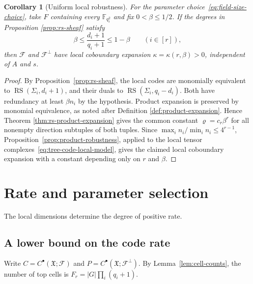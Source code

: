 \documentclass[11pt,letterpaper]{article}
\renewcommand{\le}{\leqslant}
\newtheorem{corollary}[theorem]{Corollary}
\theoremstyle{definition}
\theoremstyle{remark}
\newcommand{\F}{\mathbb F}
\newcommand{\cF}{\mathcal F}
\newcommand{\X}{\mathfrak{X}}
\newcommand{\RS}{\operatorname{RS}}
\begin{document}
\begin{corollary}[Uniform local robustness]
\label{prop:local-expansion}\label{arb:product-expansion}
For the parameter choice~\eqref{eq:field-size-choice}, take $F$ containing
every $\F_{q_i^2}$ and fix $0<\beta\le1/2$.
If the degrees in
Proposition \ref{prop:rs-sheaf} satisfy
\[
 \beta\le\frac{d_i+1}{q_i+1}\le1-\beta\qquad(i\in[r]),
\]
then $\cF$ and $\cF^\perp$ have local coboundary expansion
$\kappa=\kappa(r,\beta)>0$, independent of $A$ and $s$.
\end{corollary}
\begin{proof}
By Proposition~\ref{prop:rs-sheaf}, the local codes are monomially
equivalent to $\RS(\Sigma_i,d_i+1)$, and their duals to
$\RS(\Sigma_i,q_i-d_i)$.
Both have redundancy at least $\beta n_i$ by the hypothesis.
Product expansion is preserved by monomial equivalence, as noted
after Definition \ref{def:product-expansion}. Hence
Theorem \ref{thm:rs-product-expansion} gives the common constant
$\varrho=c_r\beta^r$ for all nonempty direction subtuples of both tuples.
Since $\max_i n_i/\min_i n_i\le4^{r-1}$,
Proposition~\ref{prop:product-robustness}, applied to the local tensor
complexes~\eqref{eq:tree-code-local-model}, gives the claimed local
coboundary expansion with a constant depending only on $r$ and $\beta$.
\end{proof}


\section{Rate and parameter selection}
\label{sec:realization}
The local dimensions determine the degree of positive rate.

\subsection{A lower bound on the code rate}
\label{sec:rate}
Write $C=C^\bullet(\X;\cF)$ and
$P=C^\bullet(\X;\cF^\perp)$. By Lemma~\ref{lem:cell-counts},
the number of top cells is $F_r=|G|\prod_i(q_i+1)$.
\end{document}
